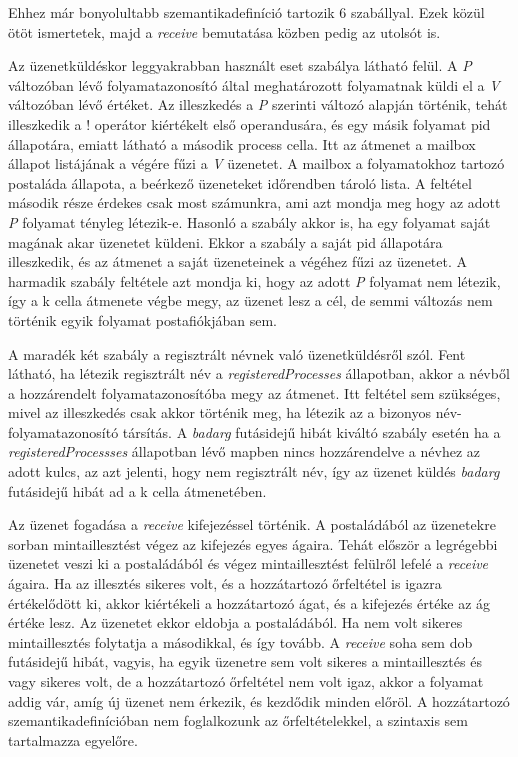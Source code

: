 Ehhez már bonyolultabb szemantikadefiníció tartozik 6 szabállyal. Ezek közül ötöt ismertetek, majd a \textit{receive} bemutatása közben pedig az utolsót is.



Az üzenetküldéskor leggyakrabban használt eset szabálya látható felül. A \textit{P} változóban lévő folyamatazonosító által meghatározott folyamatnak küldi el a \textit{V} változóban lévő értéket. Az illeszkedés a \textit{P} szerinti változó alapján történik, tehát illeszkedik a ! operátor kiértékelt első operandusára, és egy másik folyamat pid állapotára, emiatt látható a második process cella. Itt az átmenet a mailbox állapot listájának a végére fűzi a \textit{V} üzenetet. A mailbox a folyamatokhoz tartozó postaláda állapota, a beérkező üzeneteket időrendben tároló lista. A feltétel második része érdekes csak most számunkra, ami azt mondja meg hogy az adott \textit{P} folyamat tényleg létezik-e. Hasonló a szabály akkor is, ha egy folyamat saját magának akar üzenetet küldeni. Ekkor a szabály a saját pid állapotára illeszkedik, és az átmenet a saját üzeneteinek a végéhez fűzi az üzenetet. A harmadik szabály feltétele azt mondja ki, hogy az adott \textit{P} folyamat nem létezik, így a k cella átmenete végbe megy, az üzenet lesz a cél, de semmi változás nem történik egyik folyamat postafiókjában sem.



A maradék két szabály a regisztrált névnek való üzenetküldésről szól. Fent látható, ha létezik regisztrált név a \textit{registeredProcesses} állapotban, akkor a névből a hozzárendelt folyamatazonosítóba megy az átmenet. Itt feltétel sem szükséges, mivel az illeszkedés csak akkor történik meg, ha létezik az a bizonyos név-folyamatazonosító társítás. A \textit{badarg} futásidejű hibát kiváltó szabály esetén ha a \textit{registeredProcessses} állapotban lévő mapben nincs hozzárendelve a névhez az adott kulcs, az azt jelenti, hogy nem regisztrált név, így az üzenet küldés \textit{badarg} futásidejű hibát ad a k cella átmenetében.


Az üzenet fogadása a \textit{receive} kifejezéssel történik. A postaládából az üzenetekre sorban mintaillesztést végez az kifejezés egyes ágaira. Tehát először a legrégebbi üzenetet veszi ki a postaládából és végez mintaillesztést felülről lefelé a \textit{receive} ágaira. Ha az illesztés sikeres volt, és a hozzátartozó őrfeltétel is igazra értékelődött ki, akkor kiértékeli a hozzátartozó ágat, és a kifejezés értéke az ág értéke lesz. Az üzenetet ekkor eldobja a postaládából. Ha nem volt sikeres mintaillesztés folytatja a másodikkal, és így tovább. A \textit{receive} soha sem dob futásidejű hibát, vagyis, ha egyik üzenetre sem volt sikeres a mintaillesztés és vagy sikeres volt, de a hozzátartozó őrfeltétel nem volt igaz, akkor a folyamat addig vár, amíg új üzenet nem érkezik, és kezdődik minden előröl. A hozzátartozó szemantikadefinícióban nem foglalkozunk az őrfeltételekkel, a szintaxis sem tartalmazza egyelőre.


